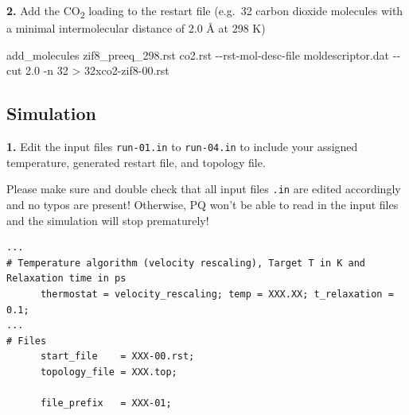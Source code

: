 \documentclass[
  letterpaper,
]{article}
\newenvironment{Shaded}{\begin{snugshade}}{\end{snugshade}}
\newcommand{\AttributeTok}[1]{\textcolor[rgb]{0.40,0.45,0.13}{#1}}
\newcommand{\ExtensionTok}[1]{\textcolor[rgb]{0.00,0.23,0.31}{#1}}
\newcommand{\NormalTok}[1]{\textcolor[rgb]{0.00,0.23,0.31}{#1}}
\newcommand{\OperatorTok}[1]{\textcolor[rgb]{0.37,0.37,0.37}{#1}}
\begin{document}
\textbf{2.} Add the CO\textsubscript{2} loading to the restart file
(e.g.~32 carbon dioxide molecules with a minimal intermolecular distance
of 2.0 Å at 298 K)

\begin{Shaded}
\begin{Highlighting}[]
\ExtensionTok{add\_molecules}\NormalTok{ zif8\_preeq\_298.rst co2.rst }\AttributeTok{{-}{-}rst{-}mol{-}desc{-}file}\NormalTok{ moldescriptor.dat }\AttributeTok{{-}{-}cut}\NormalTok{ 2.0 }\AttributeTok{{-}n}\NormalTok{ 32 }\OperatorTok{\textgreater{}}\NormalTok{ 32xco2{-}zif8{-}00.rst}
\end{Highlighting}
\end{Shaded}

\hypertarget{simulation}{%
\subsection*{Simulation}\label{simulation}}


\textbf{1.} Edit the input files \texttt{run-01.in} to
\texttt{run-04.in} to include your assigned temperature, generated
restart file, and topology file.

\begin{tcolorbox}[enhanced jigsaw, toptitle=1mm, opacitybacktitle=0.6, colframe=quarto-callout-important-color-frame, toprule=.15mm, breakable, bottomrule=.15mm, left=2mm, title=\textcolor{quarto-callout-important-color}{\faExclamation}\hspace{0.5em}{Important}, titlerule=0mm, leftrule=.75mm, bottomtitle=1mm, coltitle=black, arc=.35mm, rightrule=.15mm, opacityback=0, colback=white, colbacktitle=quarto-callout-important-color!10!white]

Please make sure and double check that all input files \texttt{.in} are
edited accordingly and no typos are present! Otherwise, PQ won't be able
to read in the input files and the simulation will stop prematurely!

\end{tcolorbox}

\begin{verbatim}
...
# Temperature algorithm (velocity rescaling), Target T in K and Relaxation time in ps
      thermostat = velocity_rescaling; temp = XXX.XX; t_relaxation = 0.1;
...
# Files
      start_file    = XXX-00.rst;
      topology_file = XXX.top;

      file_prefix   = XXX-01;
\end{verbatim}
\end{document}
